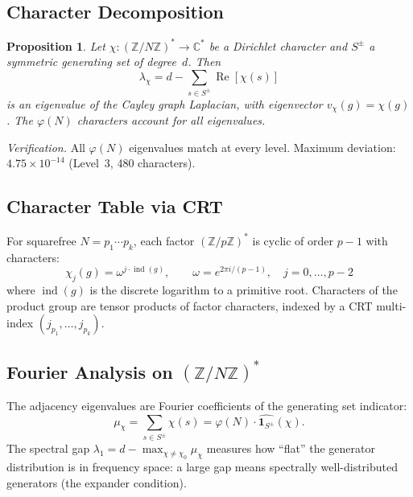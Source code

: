 \documentclass[12pt,reqno]{amsart}
\theoremstyle{plain}
\newtheorem{proposition}[theorem]{Proposition}
\theoremstyle{definition}
\theoremstyle{remark}
\DeclareMathOperator{\ind}{ind}
\newcommand{\ZZ}{\mathbb{Z}}
\newcommand{\CC}{\mathbb{C}}
\begin{document}
\subsection{Character Decomposition}

\begin{proposition}\label{prop:char_decomp}
  Let $\chi \colon (\ZZ/N\ZZ)^* \to \CC^*$ be a Dirichlet character
  and $S^\pm$ a symmetric generating set of degree~$d$.  Then
  \begin{equation}\label{eq:char_eval}
    \lambda_\chi = d - \sum_{s \in S^\pm} \operatorname{Re}[\chi(s)]
  \end{equation}
  is an eigenvalue of the Cayley graph Laplacian, with eigenvector
  $v_\chi(g) = \chi(g)$.  The $\varphi(N)$ characters account for all
  eigenvalues.
\end{proposition}

\emph{Verification.}  All $\varphi(N)$ eigenvalues match at every
level.  Maximum deviation: $4.75 \times 10^{-14}$ (Level~3, 480
characters).

\subsection{Character Table via CRT}

For squarefree $N = p_1 \cdots p_k$, each factor $(\ZZ/p\ZZ)^*$ is
cyclic of order $p-1$ with characters:
\begin{equation}\label{eq:factor_chars}
  \chi_j(g) = \omega^{j \cdot \ind(g)}, \qquad
  \omega = e^{2\pi i/(p-1)}, \quad j = 0, \ldots, p-2
\end{equation}
where $\ind(g)$ is the discrete logarithm to a primitive root.
Characters of the product group are tensor products of factor
characters, indexed by a CRT multi-index $(j_{p_1}, \ldots,
j_{p_k})$.

\subsection{Fourier Analysis on $(\ZZ/N\ZZ)^*$}

The adjacency eigenvalues are Fourier coefficients of the generating
set indicator:
\begin{equation}\label{eq:fourier}
  \mu_\chi = \sum_{s \in S^\pm} \chi(s)
  = \varphi(N) \cdot \widehat{\mathbf{1}_{S^\pm}}(\chi).
\end{equation}
The spectral gap $\lambda_1 = d - \max_{\chi \neq \chi_0} \mu_\chi$
measures how ``flat'' the generator distribution is in frequency
space: a large gap means spectrally well-distributed generators (the
expander condition).
\end{document}
